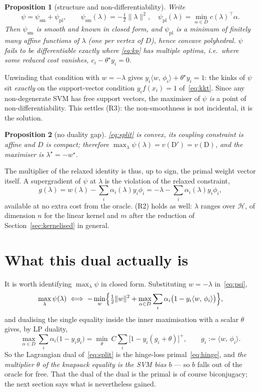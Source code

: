 \documentclass[11pt,a4paper]{report}
\newtheorem{proposition}{Proposition}[chapter]
\newcommand{\Hs}{\mathcal{H}}
\newcommand{\inner}[2]{\langle #1,\, #2 \rangle}
\begin{document}
\begin{proposition}[structure and non-differentiability]
Write
\[
\psi=\psi_{\mathrm{sm}}+\psi_{\mathrm{pl}},
\qquad
\psi_{\mathrm{sm}}(\lambda)=-\tfrac12\|\lambda\|^2,
\quad
\psi_{\mathrm{pl}}(\lambda)=\min_{\alpha\in D}c(\lambda)^{\!\top}\alpha .
\]
Then $\psi_{\mathrm{sm}}$ is smooth and known in closed form, and
$\psi_{\mathrm{pl}}$ is a minimum of finitely many affine functions of $\lambda$ (one
per vertex of $D$), hence concave polyhedral. $\psi$ fails to be differentiable exactly where
\eqref{eq:kp} has multiple optima, i.e.\ where some reduced cost vanishes,
$c_i-\theta^\star y_i=0$.
\end{proposition}
Unwinding that condition with $w=-\lambda$ gives
$y_i\inner{w}{\phi_i}+\theta^{\star}y_i=1$: the kinks of $\psi$ sit \emph{exactly} on
the support-vector condition $y_if(x_i)=1$ of~\eqref{eq:kkt}. Since any
non-degenerate SVM has free support vectors, the maximiser of $\psi$ \emph{is} a
point of non-differentiability. This settles (R3): the non-smoothness is not
incidental, it is the solution.

\begin{proposition}[no duality gap]
\eqref{eq:split} is convex, its coupling constraint is affine and $D$ is compact;
therefore $\max_\lambda\psi(\lambda)=v(\mathrm{D}')=v(\mathrm{D})$, and the maximiser
is $\lambda^\star=-w^\star$.
\end{proposition}
The multiplier of the relaxed identity is thus, up to sign, the primal weight vector
itself. A supergradient of $\psi$ at $\lambda$ is the violation of the relaxed
constraint,
\begin{equation}
\label{eq:supergrad}
g(\lambda)=w(\lambda)-\sum_i\alpha_i(\lambda)y_i\phi_i=-\lambda-\sum_i\alpha_i(\lambda)y_i\phi_i ,
\end{equation}
available at no extra cost from the oracle. (R2) holds as well: $\lambda$ ranges over
$\Hs$, of dimension $n$ for the linear kernel and $m$ after the reduction of
Section~\ref{sec:kernelised} in general.

\section{What this dual actually is}
\label{sec:whatitis}
It is worth identifying $\max_\lambda\psi$ in closed form. Substituting $w=-\lambda$
in~\eqref{eq:psi},
\[
\max_{\lambda}\psi(\lambda)
\iff
-\min_{w}\Bigl\{\tfrac12\|w\|^2+\max_{\alpha\in D}\sum_i\alpha_i\bigl(1-y_i\inner{w}{\phi_i}\bigr)\Bigr\},
\]
and dualising the single equality inside the inner maximisation with a scalar
$\theta$ gives, by LP duality,
\begin{equation}
\label{eq:theta_is_b}
\max_{\alpha\in D}\sum_i\alpha_i\bigl(1-y_ig_i\bigr)
=\min_{\theta}\ C\sum_i\bigl[1-y_i(g_i+\theta)\bigr]^+ ,
\qquad g_i:=\inner{w}{\phi_i} .
\end{equation}
So the Lagrangian dual of~\eqref{eq:split} is the hinge-loss
primal~\eqref{eq:hinge}, and \emph{the multiplier $\theta$ of the knapsack equality
is the SVM bias $b$} --- so $b$ falls out of the oracle for free. That the dual of
the dual is the primal is of course biconjugacy; the next section says what is
nevertheless gained.
\end{document}
